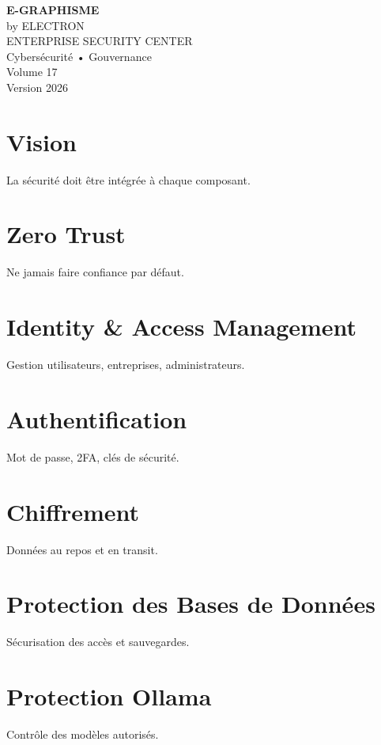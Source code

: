 \documentclass[12pt,a4paper,oneside]{book}
\begin{document}
\begin{titlepage}
\begin{center}
\vspace*{3cm}
{\Huge\bfseries\color{bleuIA}E-GRAPHISME}\\[0.3cm]
{\LARGE by ELECTRON}\\[2cm]
{\huge ENTERPRISE SECURITY CENTER}\\[0.3cm]
{\huge Cybersécurité • Gouvernance}\\[1cm]
{\Large Volume 17}\\[3cm]
{\Large Version 2026}
\end{center}
\end{titlepage}

\chapter{Vision}
La sécurité doit être intégrée à chaque composant.

\chapter{Zero Trust}
Ne jamais faire confiance par défaut.

\chapter{Identity \& Access Management}
Gestion utilisateurs, entreprises, administrateurs.

\chapter{Authentification}
Mot de passe, 2FA, clés de sécurité.

\chapter{Chiffrement}
Données au repos et en transit.

\chapter{Protection des Bases de Données}
Sécurisation des accès et sauvegardes.

\chapter{Protection Ollama}
Contrôle des modèles autorisés.
\end{document}
